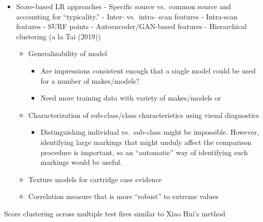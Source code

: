 \documentclass[11pt,]{isuthesis}
\providecommand{\tightlist}{%
  \setlength{\itemsep}{0pt}\setlength{\parskip}{0pt}}
\begin{document}
\begin{itemize}
\tightlist
\item
  Score-based LR approaches
  - Specific source vs.~common source and accounting for ``typicality.''
  - Inter- vs.~intra- scan features
  - Intra-scan features
  - SURF points
  - Autoencoder/GAN-based features
  - Hierarchical clustering (a la Tai (2019))

  \begin{itemize}
  \tightlist
  \item
    Generalizability of model

    \begin{itemize}
    \tightlist
    \item
      Are impressions consistent enough that a single model could be used for a number of makes/models?
    \item
      Need more training data with variety of makes/models or
    \end{itemize}
  \item
    Characterization of sub-class/class characteristics using visual diagnostics

    \begin{itemize}
    \tightlist
    \item
      Distinguishing individual vs.~sub-class might be impossible. However, identifying large markings that might unduly affect the comparison procedure is important, so an ``automatic'' way of identifying such markings would be useful.
    \end{itemize}
  \item
    Texture models for cartridge case evidence
  \item
    Correlation measure that is more ``robust'' to extreme values
  \end{itemize}
\end{itemize}

Score clustering across multiple test fires similar to Xiao Hui's method
\end{document}
